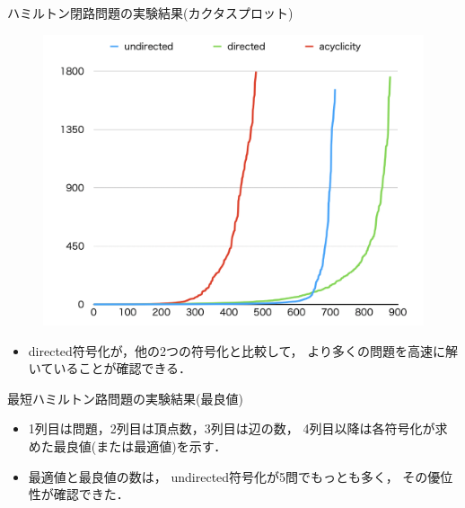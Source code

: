 \documentclass[dvipdfmx,10pt]{beamer}
\begin{document}
\begin{frame}{ハミルトン閉路問題の実験結果(カクタスプロット)}
\begin{figure}[tb]
\begin{center}
  \includegraphics[width=0.7\linewidth]{fig/cactus.png}
\label{cactus}
\end{center}
\end{figure}
\begin{itemize}
\item \textsf{directed}符号化が，他の2つの符号化と比較して，
      より多くの問題を高速に解いていることが確認できる．
\end{itemize}
\end{frame}
\begin{frame}{最短ハミルトン路問題の実験結果(最良値)}
\begin{itemize}
\item 1列目は問題，2列目は頂点数，3列目は辺の数，
      4列目以降は各符号化が求めた最良値(または最適値)を示す．
\item 最適値と最良値の数は，
      \textsf{undirected}符号化が5問でもっとも多く，
      その優位性が確認できた．
\end{itemize}
\end{frame}
\end{document}
